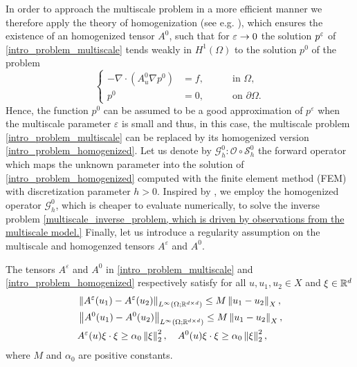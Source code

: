 \documentclass[10pt]{article}
\begin{document}
In order to approach the multiscale problem in a more efficient manner we therefore apply the theory of homogenization (see e.g. \cite{CiD99}), which ensures the existence of an homogenized tensor $A^0$, such that for $\varepsilon \to 0$ the solution $p^\varepsilon$ of \eqref{intro_problem_multiscale} tends weakly in $H^1(\Omega)$ to the solution $p^0$ of the problem
\begin{equation}
\label{intro_problem_homogenized}
\left\{
\begin{alignedat}{2}
	- \nabla \cdot ( A^0_u \nabla p^0 ) &= f, \quad && \text{ in } \Omega, \\
	p^0 &= 0, \quad && \text{ on } \partial \Omega.
\end{alignedat}
\right.
\end{equation}
Hence, the function $p^0$ can be assumed to be a good approximation of $p^{\varepsilon}$ when the multiscale parameter $\varepsilon$ is small and thus, in this case, the multiscale problem \eqref{intro_problem_multiscale} can be replaced by its homogenized version \eqref{intro_problem_homogenized}. Let us denote by $\mathcal{G}^0_h \colon \mathcal{O} \circ \mathcal{S}^0_h$ the forward operator which maps the unknown parameter into the solution of \eqref{intro_problem_homogenized} computed with the finite element method (FEM) with discretization parameter $h > 0$. Inspired by \cite{NPS12, AbD17, AbD18}, we employ the homogenized operator $\mathcal G^0_h$, which is cheaper to evaluate numerically, to solve the inverse problem \eqref{multiscale_inverse_problem, which is driven by observations from the multiscale model.} Finally, let us introduce a regularity assumption on the multiscale and homogenzed tensors $A^{\varepsilon}$ and $A^0$.
\begin{assumption} \label{ass_A}
The tensors $A^{\varepsilon}$ and $A^0$ in \eqref{intro_problem_multiscale} and \eqref{intro_problem_homogenized} respectively satisfy for all $u, u_1, u_2 \in X$ and $\xi \in \mathbb{R}^d$
\begin{align*}
& \left\|A^{\varepsilon}(u_1) - A^{\varepsilon}(u_2)\right\|_{L^{\infty}(\Omega;\mathbb{R}^{d \times d})} \le M \left\|u_1 - u_2\right\|_X, \\
& \left\|A^0(u_1) - A^0(u_2)\right\|_{L^{\infty}(\Omega;\mathbb{R}^{d \times d})} \le M \left\|u_1 - u_2\right\|_X, \\
&A^{\varepsilon}(u) \xi \cdot \xi \ge \alpha_0 \left\|\xi\right\|_2^2, \quad A^0(u) \xi \cdot \xi \ge \alpha_0 \left\|\xi\right\|_2^2,
\end{align*}
where $M$ and $\alpha_0$ are positive constants.
\end{assumption}
\end{document}
